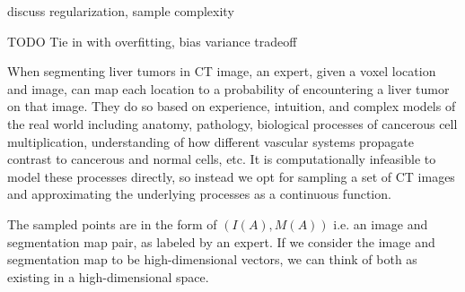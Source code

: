 discuss regularization, sample complexity

TODO Tie in with overfitting, bias variance tradeoff






When segmenting liver tumors in CT image, an expert, given a voxel location and image, can map each location to a probability of encountering a liver tumor on that image. They do so based on experience, intuition, and complex models of the real world including anatomy, pathology, biological processes of cancerous cell multiplication, understanding of how different vascular systems propagate contrast to cancerous and normal cells, etc. It is computationally infeasible to model these processes directly, so instead we opt for sampling a set of CT images and approximating the underlying processes as a continuous function.

The sampled points are in the form of $(I(A), M(A))$ i.e. an image and segmentation map pair, as labeled by an expert. If we consider the image and segmentation map to be high-dimensional vectors, we can think of both as existing in a high-dimensional space.


